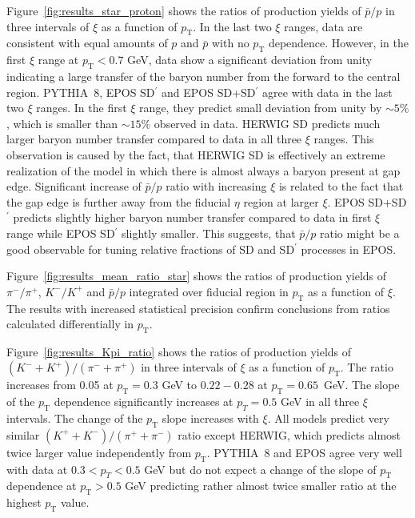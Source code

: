 Figure~\ref{fig:results_star_proton} shows the ratios of production yields of $\bar{p}/p$ in three intervals of $\xi$ as a function of $p_\textrm{T}$.
In the last two $\xi$ ranges, data are consistent with equal amounts of $p$ and $\bar{p}$ with no $p_\textrm{T}$ dependence. However, in the first $\xi$ range at $p_\textrm{T}<0.7$ GeV, data show a significant deviation from unity indicating a large transfer of the baryon number from the forward to the central region.
PYTHIA~8, EPOS SD$^\prime$ and EPOS SD+SD$^\prime$ agree with data in the last two $\xi$ ranges. In the first $\xi$ range, they predict small deviation from unity by $\sim 5\%$, which is smaller than $\sim 15\%$ observed in data. HERWIG SD  predicts much larger baryon number transfer compared to data in all three $\xi$ ranges. This observation is caused by the fact, that HERWIG SD is effectively an extreme realization of the model in which there is almost always a baryon present at gap edge. Significant increase of $\bar{p}/p$ ratio with increasing $\xi$ is related to the fact that the gap edge is further away from the fiducial $\eta$ region at larger $\xi$. EPOS SD+SD$^\prime$ predicts slightly higher baryon number transfer compared to data in first $\xi$ range while EPOS SD$^\prime$ slightly smaller.  This suggests, that $\bar{p}/p$ ratio might be a good observable for tuning relative fractions of SD and SD$^\prime$ processes in EPOS.



Figure~\ref{fig:results_mean_ratio_star} shows the ratios of production yields of $\pi^-/\pi^+$, $K^-/K^+$ and $\bar{p}/p$ integrated over fiducial region in $p_\textrm{T}$ as a function of $\xi$. The results with increased statistical precision confirm conclusions from ratios calculated differentially in $p_\textrm{T}$.


Figure~\ref{fig:results_Kpi_ratio} shows the ratios of production yields of $\left(K^-+K^+\right)/\left(\pi^-+\pi^+\right)$ in three intervals of $\xi$ as a function of $p_\textrm{T}$. The ratio increases from 0.05 at $p_\textrm{T}=0.3$ GeV to $0.22-0.28$ at $p_\textrm{T}=0.65$~GeV. The slope of the $p_\textrm{T}$ dependence significantly increases at $p_T=0.5$ GeV in all three $\xi$ intervals. The change of the $p_\textrm{T}$ slope increases with $\xi$. All models predict very similar $(K^++K^-)/(\pi^++\pi^-)$ ratio except HERWIG, which predicts almost twice larger value independently from $p_\textrm{T}$. PYTHIA~8 and EPOS agree very well with data at $0.3<p_T<0.5$ GeV but do not expect a change of the slope of $p_\textrm{T}$ dependence at $p_\textrm{T}>0.5$ GeV predicting rather almost twice smaller ratio at the highest $p_\textrm{T}$ value.


